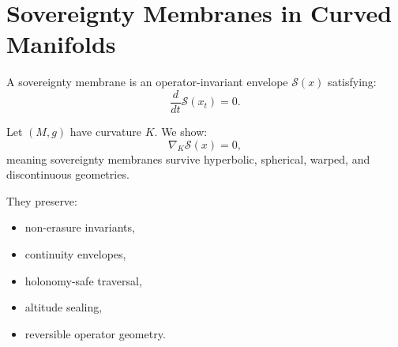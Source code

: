 \section*{Sovereignty Membranes in Curved Manifolds}

A sovereignty membrane is an operator-invariant envelope $\mathcal{S}(x)$
satisfying:
\[
\frac{d}{dt}\mathcal{S}(x_t) = 0.
\]

Let $(M, g)$ have curvature $K$. We show:
\[
\nabla_K \mathcal{S}(x) = 0,
\]
meaning sovereignty membranes survive hyperbolic, spherical, warped, and
discontinuous geometries.

They preserve:
\begin{itemize}
    \item non-erasure invariants,
    \item continuity envelopes,
    \item holonomy-safe traversal,
    \item altitude sealing,
    \item reversible operator geometry.
\end{itemize}
